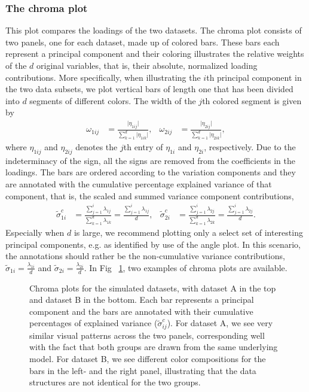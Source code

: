 \documentclass[a4paper,14pt]{article}
\begin{document}
\subsubsection*{The chroma plot}
This plot compares the loadings of the two datasets. The chroma plot consists of two panels, one for each dataset, made up of colored bars. These bars each represent a principal component and their coloring illustrates the relative weights of the $d$ original variables, that is, their absolute, normalized loading contributions. More specifically, when illustrating the $i$th principal component in the two data subsets, we plot vertical bars of length one that has been divided into $d$ segments of different colors. The width of the $j$th colored segment is given by
\begin{align*}
\omega_{1ij} &= \frac{\lvert\eta_{1ij}\rvert}{\sum_{k=1}^d \lvert\eta_{1ik}\rvert}, &
\omega_{2ij} &= \frac{\lvert\eta_{2ij}\rvert}{\sum_{k=1}^d \lvert\eta_{2ik}\rvert},
\end{align*}
where $\eta_{1ij}$ and $\eta_{2ij}$ denotes the $j$th entry of $\eta_{1i}$ and $\eta_{2i}$, respectively. Due to the indeterminacy of the sign, all the signs are removed from the coefficients in the loadings. The bars are ordered according to the variation components and they are annotated with the cumulative percentage explained variance of that component, that is, the scaled and summed variance component contributions,
\begin{align*}
\tilde\sigma^c_{1i} &= \frac{\sum_{j=1}^i \lambda_{1j}}{\sum_{k=1}^d \lambda_{1k}} = \frac{\sum_{j=1}^i \lambda_{1j}}{d}, &
\tilde\sigma^c_{2i} &= \frac{\sum_{j=1}^i \lambda_{2j}}{\sum_{k=1}^d \lambda_{2k}} = \frac{\sum_{j=1}^i \lambda_{2j}}{d}.
\end{align*}
Especially when $d$ is large, we recommend plotting only a select set of interesting principal components, e.g. as identified by use of the angle plot. In this scenario, the annotations should rather be the non-cumulative variance contributions, $\tilde\sigma_{1i} = \frac{\lambda_{1i}}{d}$ and $\tilde\sigma_{2i} = \frac{\lambda_{2i}}{d}$. In Fig~ \ref{plot.simChroma}, two examples of chroma plots are available.

\begin{figure}[!h]
\caption{Chroma plots for the simulated datasets, with dataset A in the top and dataset B in the bottom. Each bar represents a principal component and the bars are annotated with their cumulative percentages of explained variance ($\tilde\sigma_{ij}^c$). For dataset A, we see very similar visual patterns across the two panels, corresponding well with the fact that both groups are drawn from the same underlying model. For dataset B, we see different color compositions for the bars in the left- and the right panel, illustrating that the data structures are not identical for the two groups.}
\label{plot.simChroma}
\end{figure}
\end{document}
